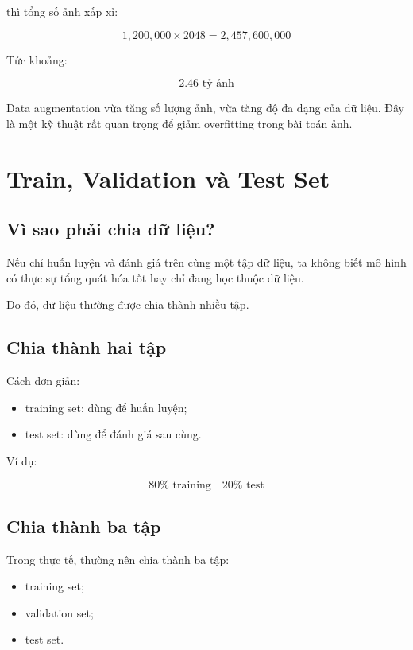 \documentclass[12pt,a4paper]{report}
\begin{document}
thì tổng số ảnh xấp xỉ:

\[
    1,200,000 \times 2048
    =
    2,457,600,000
\]

Tức khoảng:

\[
    2.46 \text{ tỷ ảnh}
\]

\begin{ghinho}
Data augmentation vừa tăng số lượng ảnh, vừa tăng độ đa dạng của dữ liệu. Đây là một kỹ thuật rất quan trọng để giảm overfitting trong bài toán ảnh.
\end{ghinho}

\chapter{Train, Validation và Test Set}

\section{Vì sao phải chia dữ liệu?}

Nếu chỉ huấn luyện và đánh giá trên cùng một tập dữ liệu, ta không biết mô hình có thực sự tổng quát hóa tốt hay chỉ đang học thuộc dữ liệu.

Do đó, dữ liệu thường được chia thành nhiều tập.

\section{Chia thành hai tập}

Cách đơn giản:

\begin{itemize}
    \item training set: dùng để huấn luyện;
    \item test set: dùng để đánh giá sau cùng.
\end{itemize}

Ví dụ:

\[
    80\% \text{ training}
    \quad
    20\% \text{ test}
\]

\section{Chia thành ba tập}

Trong thực tế, thường nên chia thành ba tập:

\begin{itemize}
    \item training set;
    \item validation set;
    \item test set.
\end{itemize}
\end{document}
